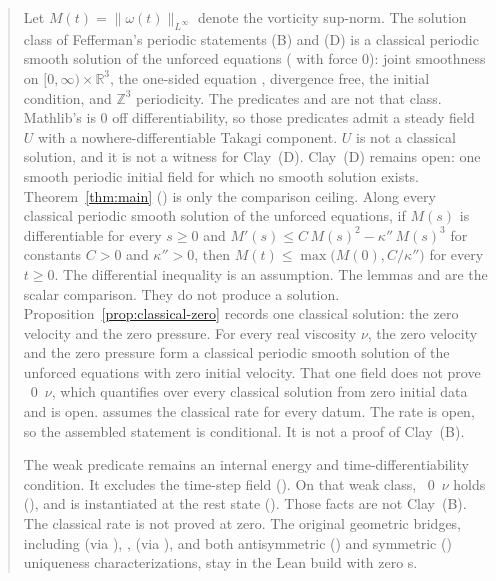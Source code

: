 \documentclass[11pt,a4paper]{article}
\theoremstyle{plain}
\theoremstyle{definition}
\theoremstyle{remark}
\newcommand{\R}{\mathbb{R}}
\begin{document}
\begin{abstract}
Let $M(t)=\|\omega(t)\|_{L^\infty}$ denote the vorticity sup-norm. The solution class of Fefferman's periodic statements (B) and (D) is a classical periodic smooth solution of the unforced equations ( with force $0$): joint smoothness on $[0,\infty)\times\R^3$, the one-sided equation , divergence free, the initial condition, and $\mathbb{Z}^3$ periodicity. The predicates  and  are not that class. Mathlib's  is $0$ off differentiability, so those predicates admit a steady field $U$ with a nowhere-differentiable Takagi component. $U$ is not a classical solution, and it is not a witness for Clay~(D). Clay~(D) remains open: one smooth periodic initial field for which no smooth solution exists. Theorem~\ref{thm:main} () is only the comparison ceiling. Along every classical periodic smooth solution of the unforced equations, if $M(s)$ is differentiable for every $s\ge0$ and $M'(s)\le C\,M(s)^2-\kappa''\,M(s)^3$ for constants $C>0$ and $\kappa''>0$, then $M(t)\le\max\bigl(M(0),C/\kappa''\bigr)$ for every $t\ge0$. The differential inequality is an assumption. The lemmas  and  are the scalar comparison. They do not produce a solution. Proposition~\ref{prop:classical-zero} records one classical solution: the zero velocity and the zero pressure. For every real viscosity $\nu$, the zero velocity and the zero pressure form a classical periodic smooth solution of the unforced equations with zero initial velocity. That one field does not prove ~$0$~$\nu$, which quantifies over every classical solution from zero initial data and is open.  assumes the classical rate for every datum. The rate is open, so the assembled statement is conditional. It is not a proof of Clay~(B).

The weak predicate  remains an internal energy and time-differentiability condition. It excludes the time-step field (). On that weak class, ~$0$~$\nu$ holds (), and  is instantiated at the rest state (). Those facts are not Clay~(B). The classical rate  is not proved at zero. The original geometric bridges, including  (via ), ,  (via ), and both antisymmetric () and symmetric () uniqueness characterizations, stay in the Lean build with zero s.
\end{abstract}
\end{document}
